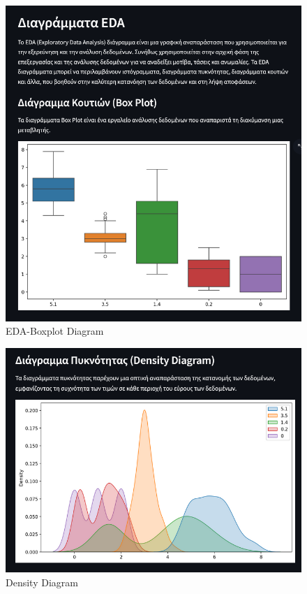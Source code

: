 \documentclass[unnumsec,webpdf,contemporary,large]{oup-authoring-template}%
\theoremstyle{thmstyleone}%
\theoremstyle{thmstyletwo}%
\theoremstyle{thmstylethree}%
\begin{document}
\begin{figure}
    \centering
    \includegraphics[width=1\linewidth]{eda-boxplot.png}
    \caption{EDA-Boxplot Diagram}
    \label{fig:eda-boxplot}
\end{figure}

\begin{figure}
    \centering
    \includegraphics[width=1\linewidth]{density.png}
    \caption{Density Diagram}
    \label{fig:density}
\end{figure}
\end{document}
